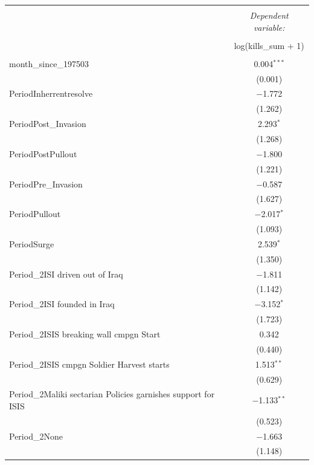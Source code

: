 \begin{table}[ht] \centering 
\begin{adjustbox}{width=1\textwidth}
\small 
\begin{tabular}{@{\extracolsep{5pt}}lc} 
\\[-1.8ex]\hline 
\hline \\[-1.8ex] 
 & \multicolumn{1}{c}{\textit{Dependent variable:}} \\ 
\cline{2-2} 
\\[-1.8ex] & log(kills\_sum + 1) \\ 
\hline \\[-1.8ex] 
 month\_since\_197503 & 0.004$^{***}$ \\ 
  & (0.001) \\
 PeriodInherrentresolve & $-$1.772 \\ 
  & (1.262) \\
 PeriodPost\_Invasion & 2.293$^{*}$ \\ 
  & (1.268) \\
 PeriodPostPullout & $-$1.800 \\ 
  & (1.221) \\
 PeriodPre\_Invasion & $-$0.587 \\ 
  & (1.627) \\
 PeriodPullout & $-$2.017$^{*}$ \\ 
  & (1.093) \\
 PeriodSurge & 2.539$^{*}$ \\ 
  & (1.350) \\
 Period\_2ISI driven out of Iraq & $-$1.811 \\ 
  & (1.142) \\
 Period\_2ISI founded in Iraq & $-$3.152$^{*}$ \\ 
  & (1.723) \\
 Period\_2ISIS breaking wall cmpgn Start & 0.342 \\ 
  & (0.440) \\
 Period\_2ISIS cmpgn Soldier Harvest starts & 1.513$^{**}$ \\ 
  & (0.629) \\
 Period\_2Maliki sectarian Policies garnishes support for ISIS & $-$1.133$^{**}$ \\ 
  & (0.523) \\
 Period\_2None & $-$1.663 \\ 
  & (1.148) \\

\end{tabular}
\end{adjustbox}
\end{table}
